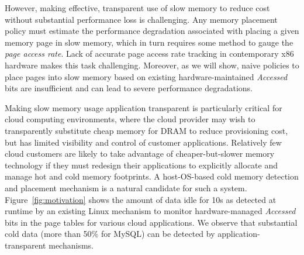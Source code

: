%

However, making effective, transparent use of slow memory to reduce cost without substantial performance loss is challenging.
Any memory placement policy must estimate the performance degradation
associated with placing a given memory page in slow memory, which in turn requires some
method to gauge the {\it page access rate}. Lack of accurate page access
rate tracking in contemporary x86 hardware makes this task challenging.
Moreover, as we will show, naive policies to place pages into slow memory based
on existing hardware-maintained {\it Accessed} bits are insufficient and can lead to severe
performance degradations.

Making slow memory usage application transparent is particularly
critical for cloud computing environments, where the cloud provider may wish to
transparently substitute cheap memory for DRAM to reduce provisioning cost, but
has limited visibility and control of customer applications.  Relatively few
cloud customers are likely to take advantage of cheaper-but-slower memory
technology if they must redesign their applications to explicitly allocate and
manage hot and cold memory footprints. A host-OS-based cold memory detection and
placement mechanism is a natural candidate for such a system.
Figure~\ref{fig:motivation} shows the amount of data idle for 10s as detected at
runtime by an existing Linux mechanism to monitor hardware-managed {\it Accessed} bits in the page tables for various
cloud applications. We observe that substantial cold data (more
than 50\% for MySQL) can be detected by application-transparent mechanisms.

